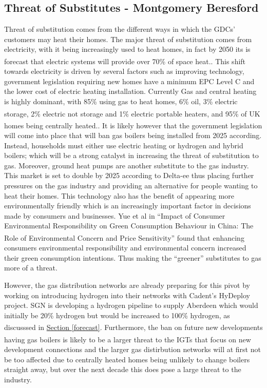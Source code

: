 \documentclass[11pt]{article}		%
\newcommand{\supercite}[1]{\textsuperscript{\cite{#1}}}		%
\newcommand{\sectref}[1]{\hyperref[#1]{Section \ref*{#1}}}     %
\begin{document}
        \subsection[Threat of Substitutes]{Threat of Substitutes - Montgomery Beresford} \label{customerSubstitutes}
                Threat of substitution comes from the different ways in which the GDCs’ customers may heat their homes. The major threat of substitution comes from electricity, with it being increasingly used to heat homes, in fact by 2050 its is forecast that electric systems will provide over 70\% of space heat.\supercite{heating_tech}.  This shift towards electricity is driven by several factors such as improving technology, government legislation requiring new homes have a minimum EPC Level C and the lower cost of electric heating installation. Currently Gas and central heating is highly dominant, with 85\% using gas to heat homes, 6\% oil, 3\% electric storage, 2\% electric not storage and 1\% electric portable heaters\supercite{heating}, and  95\% of UK homes being centrally heated.\supercite{central_heating}. It is likely however that the government legislation will come into place that will ban gas boilers being installed from 2025 according. Instead, households must either use electric heating or hydrogen and hybrid boilers; which will be a strong catalyst in increasing the threat of substitution to gas. 
                Moreover, ground heat pumps are another substitute to the gas industry. This market is set to double by 2025 according to Delta-ee thus placing further pressures on the gas industry and providing an alternative for people wanting to heat their homes. This technology also has the benefit of appearing more environmentally friendly which is an increasingly important factor in decisions made by consumers and businesses. Yue et al in “Impact of Consumer Environmental Responsibility on Green Consumption Behaviour in China: The Role of Environmental Concern and Price Sensitivity” \supercite{Environmental} found that enhancing consumers environmental responsibility and environmental concern increased their green consumption intentions. Thus making the “greener” substitutes to gas more of a threat.
                
                However, the gas distribution networks are already preparing for this pivot by working on introducing hydrogen into their networks with Cadent’s HyDeploy project. SGN is developing a hydrogen pipeline to supply Aberdeen which would initially be 20\% hydrogen but would be increased to 100\% hydrogen, as discusssed in \sectref{forecast}. \supercite{Cadent_Plan}
               Furthermore, the ban on future new developments having gas boilers \supercite{boiler_ban} is likely to be a larger threat to the IGTs that focus on new development connections and the larger gas distirbution networks will at first not be too affected due to centrally heated homes being unlikely to change boilers straight away, but over the next decade this does pose a large threat to the industry.
              
\end{document}
